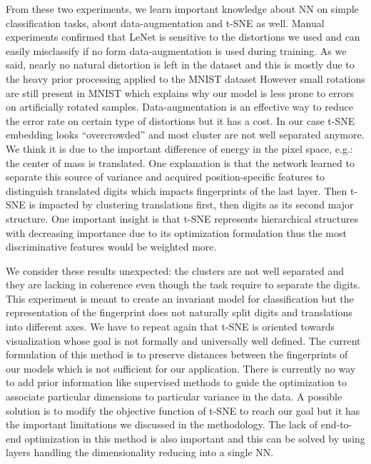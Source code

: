 \documentclass[a4paper,12pt]{report}
\newcommand{\eg}{e.g.}
\begin{document}
From these two experiments, we learn important knowledge about NN on simple classification tasks, about data-augmentation and t-SNE as well.
Manual experiments confirmed that LeNet is sensitive to the distortions we used and can easily misclassify if no form data-augmentation is used during training.
As we said, nearly no natural distortion is left in the dataset and this is mostly due to the heavy prior processing applied to the MNIST dataset
However small rotations are still present in MNIST which explains why our model is less prone to errors on artificially rotated samples.
Data-augmentation is an effective way to reduce the error rate on certain type of distortions but it has a cost.
In our case t-SNE embedding looks ``overcrowded'' and most cluster are not well separated anymore.
We think it is due to the important difference of energy in the pixel space, \eg: the center of mass is translated.
One explanation is that the network learned to separate this source of variance and acquired position-specific features to distinguish translated digits which impacts fingerprints of the last layer.
Then t-SNE is impacted by clustering translations first, then digits as its second major structure.
One important insight is that t-SNE represents hierarchical structures with decreasing importance due to its optimization formulation thus the most discriminative features would be weighted more.

We consider these results unexpected: the clusters are not well separated and they are lacking in coherence even though the task require to separate the digits.
This experiment is meant to create an invariant model for classification but the representation of the fingerprint does not naturally split digits and translations into different axes.
We have to repeat again that t-SNE is oriented towards visualization whose goal is not formally and universally well defined.
The current formulation of this method is to preserve distances between the fingerprints of our models which is not sufficient for our application.
There is currently no way to add prior information like supervised methods to guide the optimization to associate particular dimensions to particular variance in the data.
A possible solution is to modify the objective function of t-SNE to reach our goal but it has the important limitations we discussed in the methodology.
The lack of end-to-end optimization in this method is also important and this can be solved by using layers handling the dimensionality reducing into a single NN.
\end{document}
